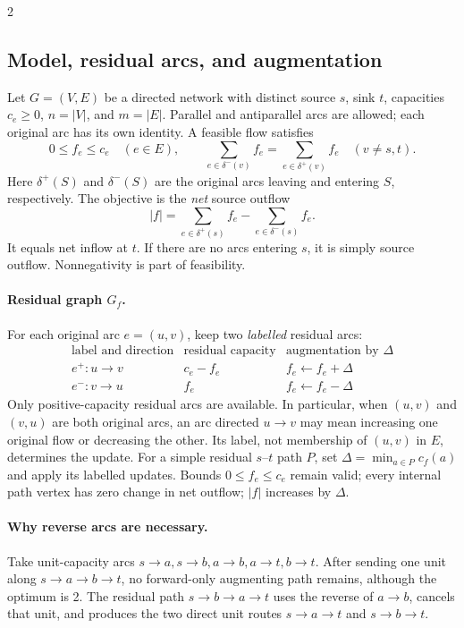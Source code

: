 \documentclass[10pt]{article}
\theoremstyle{definition}
\begin{document}
\begin{multicols*}{2}
\subsection{Model, residual arcs, and augmentation}\label{nf:model}
Let $G=(V,E)$ be a directed network with distinct source $s$, sink $t$,
capacities $c_e\ge0$, $n=|V|$, and $m=|E|$. Parallel and antiparallel arcs
are allowed; each original arc has its own identity. A feasible flow satisfies
\[
  0\le f_e\le c_e\quad(e\in E),\qquad
  \sum_{e\in\delta^-(v)}f_e=\sum_{e\in\delta^+(v)}f_e
  \quad(v\ne s,t).
\]
Here $\delta^+(S)$ and $\delta^-(S)$ are the original arcs leaving and entering
$S$, respectively. The objective is the \emph{net} source outflow
\[
  |f|=\sum_{e\in\delta^+(s)}f_e-\sum_{e\in\delta^-(s)}f_e.
\]
It equals net inflow at $t$. If there are no arcs entering $s$, it is simply
source outflow. Nonnegativity is part of feasibility.

\paragraph{Residual graph $G_f$.}
For each original arc $e=(u,v)$, keep two \emph{labelled} residual arcs:
\[
\begin{array}{c|c|c}
\text{label and direction}&\text{residual capacity}&\text{augmentation by }\Delta\\\hline
 e^+:u\to v&c_e-f_e&f_e\gets f_e+\Delta\\
 e^-:v\to u&f_e&f_e\gets f_e-\Delta
\end{array}
\]
Only positive-capacity residual arcs are available. In particular, when
$(u,v)$ and $(v,u)$ are both original arcs, an arc directed $u\to v$ may
mean increasing one original flow or decreasing the other. Its label, not
membership of $(u,v)$ in $E$, determines the update.
For a simple residual $s$--$t$ path $P$, set
$\Delta=\min_{a\in P}c_f(a)$ and apply its labelled updates.
Bounds $0\le f_e\le c_e$ remain valid; every internal path vertex has zero
change in net outflow; $|f|$ increases by $\Delta$.

\paragraph{Why reverse arcs are necessary.}
Take unit-capacity arcs $s\to a,s\to b,a\to b,a\to t,b\to t$.
After sending one unit along $s\to a\to b\to t$, no forward-only
augmenting path remains, although the optimum is 2. The residual path
$s\to b\to a\to t$ uses the reverse of $a\to b$, cancels that unit, and
produces the two direct unit routes $s\to a\to t$ and $s\to b\to t$.


\end{multicols*}
\end{document}
